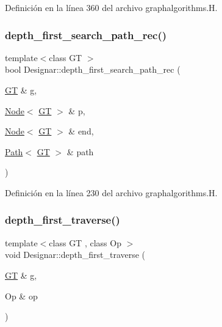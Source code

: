 Definición en la línea 360 del archivo graphalgorithms.\+H.

\mbox{\label{namespace_designar_a0a2a9a44cfea24efc22cab8b8a9d2acd}} 
\subsubsection{\texorpdfstring{depth\+\_\+first\+\_\+search\+\_\+path\+\_\+rec()}{depth\_first\_search\_path\_rec()}}
{\footnotesize\ttfamily template$<$class GT $>$ \\
bool Designar\+::depth\+\_\+first\+\_\+search\+\_\+path\+\_\+rec (\begin{DoxyParamCaption}\item[{\hyperlink{demo-buildgraph_8_c_a3001c40d2c31ca87ed96cd7d1334a55e}{GT} \&}]{g,  }\item[{\hyperlink{namespace_designar_a5af326c65aa2bd26b26c410f2030d09e}{Node}$<$ \hyperlink{demo-buildgraph_8_c_a3001c40d2c31ca87ed96cd7d1334a55e}{GT} $>$ \&}]{p,  }\item[{\hyperlink{namespace_designar_a5af326c65aa2bd26b26c410f2030d09e}{Node}$<$ \hyperlink{demo-buildgraph_8_c_a3001c40d2c31ca87ed96cd7d1334a55e}{GT} $>$ \&}]{end,  }\item[{\hyperlink{class_designar_1_1_path}{Path}$<$ \hyperlink{demo-buildgraph_8_c_a3001c40d2c31ca87ed96cd7d1334a55e}{GT} $>$ \&}]{path }\end{DoxyParamCaption})}



Definición en la línea 230 del archivo graphalgorithms.\+H.

\mbox{\label{namespace_designar_a259944a482130c7a304058ed801872a9}} 
\subsubsection{\texorpdfstring{depth\+\_\+first\+\_\+traverse()}{depth\_first\_traverse()}\hspace{0.1cm}{\footnotesize\ttfamily [1/2]}}
{\footnotesize\ttfamily template$<$class GT , class Op $>$ \\
void Designar\+::depth\+\_\+first\+\_\+traverse (\begin{DoxyParamCaption}\item[{\hyperlink{demo-buildgraph_8_c_a3001c40d2c31ca87ed96cd7d1334a55e}{GT} \&}]{g,  }\item[{Op \&}]{op }\end{DoxyParamCaption})}



